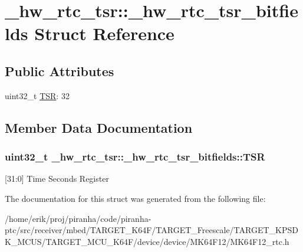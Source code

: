 \hypertarget{struct__hw__rtc__tsr_1_1__hw__rtc__tsr__bitfields}{}\section{\+\_\+hw\+\_\+rtc\+\_\+tsr\+:\+:\+\_\+hw\+\_\+rtc\+\_\+tsr\+\_\+bitfields Struct Reference}
\label{struct__hw__rtc__tsr_1_1__hw__rtc__tsr__bitfields}
\subsection*{Public Attributes}
\begin{DoxyCompactItemize}
\item 
uint32\+\_\+t \hyperlink{struct__hw__rtc__tsr_1_1__hw__rtc__tsr__bitfields_ad9dcb4a03c8793c89e2be773bf9d55e9}{T\+SR}\+: 32
\end{DoxyCompactItemize}


\subsection{Member Data Documentation}
\subsubsection[{\texorpdfstring{T\+SR}{TSR}}]{\setlength{\rightskip}{0pt plus 5cm}uint32\+\_\+t \+\_\+hw\+\_\+rtc\+\_\+tsr\+::\+\_\+hw\+\_\+rtc\+\_\+tsr\+\_\+bitfields\+::\+T\+SR}\hypertarget{struct__hw__rtc__tsr_1_1__hw__rtc__tsr__bitfields_ad9dcb4a03c8793c89e2be773bf9d55e9}{}\label{struct__hw__rtc__tsr_1_1__hw__rtc__tsr__bitfields_ad9dcb4a03c8793c89e2be773bf9d55e9}
\mbox{[}31\+:0\mbox{]} Time Seconds Register 

The documentation for this struct was generated from the following file\+:\begin{DoxyCompactItemize}
\item 
/home/erik/proj/piranha/code/piranha-\/ptc/src/receiver/mbed/\+T\+A\+R\+G\+E\+T\+\_\+\+K64\+F/\+T\+A\+R\+G\+E\+T\+\_\+\+Freescale/\+T\+A\+R\+G\+E\+T\+\_\+\+K\+P\+S\+D\+K\+\_\+\+M\+C\+U\+S/\+T\+A\+R\+G\+E\+T\+\_\+\+M\+C\+U\+\_\+\+K64\+F/device/device/\+M\+K64\+F12/M\+K64\+F12\+\_\+rtc.\+h\end{DoxyCompactItemize}
